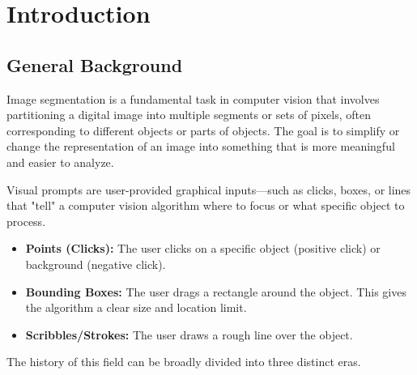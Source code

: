 \chapter{Introduction}
\label{Chapter1}

\section{General Background}
Image segmentation is a fundamental task in computer vision that involves partitioning a digital image into multiple segments or sets of pixels, often corresponding to different objects or parts of objects. The goal is to simplify or change the representation of an image into something that is more meaningful and easier to analyze.

Visual prompts are user-provided graphical inputs—such as clicks, boxes, or lines that "tell" a computer vision algorithm where to focus or what specific object to process.

\begin{itemize}
	\item \textbf{Points (Clicks): }The user clicks on a specific object (positive click) or background (negative click).
	
	\item \textbf{Bounding Boxes: }The user drags a rectangle around the object. This gives the algorithm a clear size and location limit.
	
	\item \textbf{Scribbles/Strokes: }The user draws a rough line over the object.
\end{itemize}

The history of this field can be broadly divided into three distinct eras.

